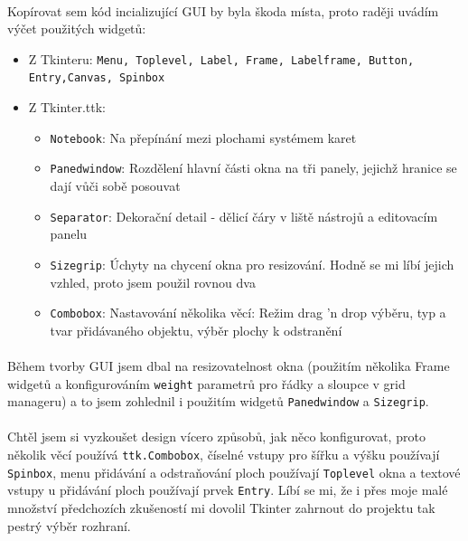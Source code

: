\documentclass[12pt,a4paper]{report}
\begin{document}
\paragraph{} Kopírovat sem kód incializující GUI by byla škoda místa, proto raději uvádím výčet použitých widgetů:
\begin{itemize}
    \item Z Tkinteru: \newline\lstinline{Menu, Toplevel, Label, Frame, Labelframe, Button, Entry,}\newline\lstinline{Canvas, Spinbox}
    \item Z Tkinter.ttk: \begin{itemize}
        \item \lstinline{Notebook}: Na přepínání mezi plochami systémem karet
        \item \lstinline{Panedwindow}: Rozdělení hlavní části okna na tři panely, jejichž hranice se dají vůči sobě posouvat
        \item \lstinline{Separator}: Dekorační detail - dělicí čáry v liště nástrojů a editovacím panelu
        \item \lstinline{Sizegrip}: Úchyty na chycení okna pro resizování. Hodně se mi líbí jejich vzhled, proto jsem použil rovnou dva
        \item \lstinline{Combobox}: Nastavování několika věcí: Režim drag 'n drop výběru, typ a tvar přidávaného objektu, výběr plochy k odstranění
    \end{itemize}
\end{itemize}
\paragraph{} Během tvorby GUI jsem dbal na resizovatelnost okna (použitím několika Frame widgetů a konfigurováním \lstinline{weight} parametrů pro řádky a sloupce v grid manageru) a to jsem zohlednil i použitím widgetů \lstinline{Panedwindow} a \lstinline{Sizegrip}.
\paragraph{} Chtěl jsem si vyzkoušet design vícero způsobů, jak něco konfigurovat, proto několik věcí používá \lstinline{ttk.Combobox}, číselné vstupy pro šířku a výšku používají \lstinline{Spinbox}, menu přidávání a odstraňování ploch používají \lstinline{Toplevel} okna a textové vstupy u přidávání ploch používají prvek \lstinline{Entry}. Líbí se mi, že i přes moje malé množství předchozích zkušeností mi dovolil Tkinter zahrnout do projektu tak pestrý výběr rozhraní.
\end{document}

